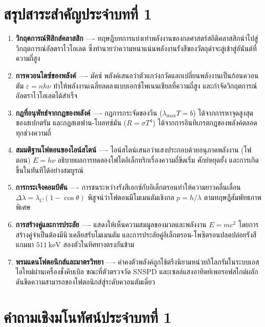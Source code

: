 \section{สรุปสาระสำคัญประจำบทที่ 1}

\begin{enumerate}
    \item \textbf{วิกฤตการณ์ฟิสิกส์คลาสสิก} ---- ทฤษฎีบทการแบ่งเท่าพลังงานของกลศาสตร์สถิติคลาสสิกนำไปสู่วิกฤตการณ์อัลตราไวโอเลต ซึ่งทำนายว่าความหนาแน่นพลังงานรังสีของวัตถุดำจะลู่เข้าสู่อันันต์ที่ความถี่สูง
    \item \textbf{การควอนไตซ์ของพลังค์} ---- มัคซ์ พลังค์เสนอว่าตัวแกว่งกวัดแลกเปลี่ยนพลังงานเป็นก้อนควอนตัม $\varepsilon = n h\nu$ ทำให้พลังงานเฉลี่ยลดลงแบบเอกซ์โพเนนเชียลที่ความถี่สูง และกำจัดวิกฤตการณ์อัลตราไวโอเลตได้สำเร็จ
    \item \textbf{กฎที่อนุพัทธ์จากกฎของพลังค์} ---- กฎการกระจัดของวีน ($\lambda_{\max} T = b$) ได้จากการหาจุดสูงสุดของสเปกตรัม และกฎสเตฟาน-โบลทซ์มัน ($R = \sigma T^4$) ได้จากการอินทิเกรตกฎของพลังค์ตลอดทุกช่วงความถี่
    \item \textbf{สมมติฐานโฟตอนของไอน์สไตน์} ---- ไอน์สไตน์เสนอว่าแสงประกอบด้วยอนุภาคพลังงาน (โฟตอน) $E = h\nu$ อธิบายผลการทดลองโฟโตอิเล็กทริกเรื่องความถี่ขีดเริ่ม ศักย์หยุดยั้ง และการเกิดขึ้นในทันทีได้อย่างสมบูรณ์
    \item \textbf{การกระเจิงคอมป์ตัน} ---- การชนระหว่างรังสีเอกซ์กับอิเล็กตรอนทำให้ความยาวคลื่นเลื่อน $\Delta\lambda = \lambda_C(1-\cos\theta)$ พิสูจน์ว่าโฟตอนมีโมเมนตัมเชิงกล $p = h/\lambda$ ตามทฤษฎีสัมพัทธภาพพิเศษ
    \item \textbf{การสร้างคู่และการประลัย} ---- แสดงให้เห็นความสมมูลของมวลและพลังงาน $E = mc^2$ โดยการสร้างคู่จำเป็นต้องมีนิวเคลียสรับโมเมนตัม และการประลัยคู่อิเล็กตรอน-โพซิตรอนปลดปล่อยรังสีแกมมา $511~\text{keV}$ สองตัวในทิศทางตรงกันข้าม
    \item \textbf{พรมแดนโฟตอนิกส์และมาตรวิทยา} ---- ค่าคงตัวพลังค์ถูกใช้ตรึงนิยามหน่วยกิโลกรัมในระบบเอสไอใหม่ผ่านเครื่องชั่งคิบเบิล ขณะที่ตัวตรวจวัด SNSPD และเซลล์แสงอาทิตย์เพอรอฟสไกต์ผลักดันขีดความสามารถของโฟตอนิกส์สู่ระดับควอนตัมเดี่ยว
\end{enumerate}

\section{คำถามเชิงมโนทัศน์ประจำบทที่ 1}

